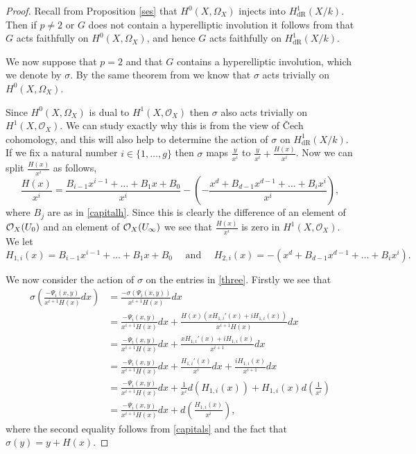 \documentclass[11pt]{article} %
\theoremstyle{plain}
\theoremstyle{remark}
\newcommand{\cO}{{\cal O}}
\newcommand{\cech}{\v{C}ech }
\newcommand{\hzero}{{H^0(X,\Omega_X)}}
\newcommand{\hone}{H^1(X,\mathcal{O}_X)}
\newcommand{\derhamhone}{H_{\text {dR}}^1(X/k)}
\begin{document}
\begin{proof}
Recall from Proposition \ref{ses} that $H^0(X,\Omega_X)$ injects into $\derhamhone$.
Then if $p \neq 2$ or $G$ does not contain a hyperelliptic involution it follows from \cite[Thm. 4.2]{faithfulaction} that $G$ acts faithfully on $H^0(X,\Omega_X)$, and hence $G$ acts faithfully on $\derhamhone$.

We now suppose that $p=2$ and that $G$ contains a hyperelliptic involution, which we denote by $\sigma$.
By the same theorem from \cite{faithfulaction} we know that $\sigma$ acts trivially on $\hzero$.

Since $\hzero$ is dual to $\hone$ then $\sigma$ also acts trivially on $\hone$.
We can study exactly why this is from the view of \cech cohomology, and this will also help to determine the action of $\sigma$ on $\derhamhone$.
If we fix a natural number $i\in \{1, \ldots ,g\}$ then $\sigma$ maps $\frac{y}{x^i}$ to $\frac{y}{x^i} + \frac{H(x)}{x^i}$. 
Now we can split $\frac{H(x)}{x^i}$ as follows, 
\begin{equation*}
\frac{H(x)}{x^i} =  \frac{B_{i-1}x^{i-1} + \ldots + B_1x + B_0}{x^i} - \left( - \frac{x^d + B_{d-1}x^{d-1} + \ldots + B_ix^i}{x^i} \right),
\end{equation*}
where $B_j$ are as in \eqref{capitalh}.
Since this is clearly the difference of an element of $\cO_X(U_0)$ and an element of $\cO_X(U_\infty)$ we see that $\frac{H(x)}{x^i}$ is zero in $\hone$.
We let 
\[
H_{1,i}(x) = B_{i-1}x^{i-1} + \ldots + B_1x + B_0 \quad \text{ and } \quad H_{2,i}(x) = -( x^d + B_{d-1}x^{d-1} + \ldots + B_ix^i).
\]

We now consider the action of $\sigma$ on the entries in \eqref{three}.
Firstly we see that
\begin{align*}
\sigma \left( \frac{-\Psi_i(x,y)}{x^{i+1}H(x)} dx\right) & = \frac{-\sigma(\Psi_i(x,y))}{x^{i+1} H(x)} dx \\
& = \frac{-\Psi_i(x,y)}{x^{i+1}H(x)}dx + \frac{H(x)(xH_{1,i}'(x) + iH_{1,i}(x))}{x^{i+1}H(x)}dx\\
& = \frac{-\Psi_i(x,y)}{x^{i+1}H(x)}dx + \frac{xH_{1,i}'(x) + iH_{1,i}(x)}{x^{i+1}}dx \\
& = \frac{-\Psi_i(x,y)}{x^{i+1}H(x)}dx +  \frac{H_{1,i}'(x)}{x^i}dx + \frac{iH_{1,i}(x)}{x^{i+1}}dx \\
& = \frac{-\Psi_i(x,y)}{x^{i+1}H(x)}dx +  \frac{1}{x^i}d\left( H_{1,i}(x) \right) + H_{1,i}(x) d \left( \frac{1}{x^i} \right) \\
& = \frac{-\Psi_i(x,y)}{x^{i+1}H(x)}dx + d\left( \frac{H_{1,i}(x)}{x^i} \right),
\end{align*}
where the second equality follows from \eqref{capitals} and the fact that $\sigma(y) = y + H(x)$.


\end{proof}
\end{document}
